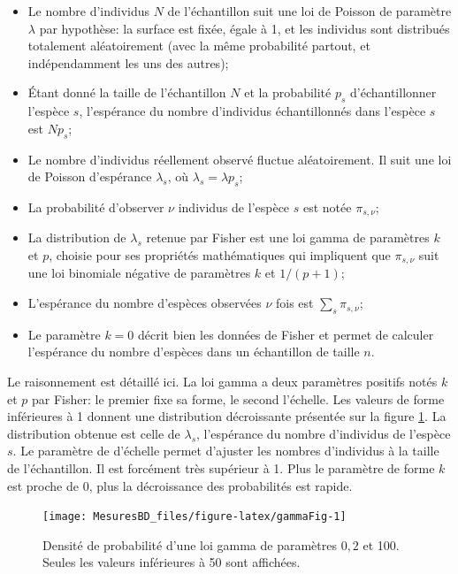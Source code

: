 \documentclass[
  11pt,
  french,
  a4paper,
  extrafontsizes,onecolumn,openright
  ]{memoir}
\providecommand{\tightlist}{%
  \setlength{\itemsep}{0pt}\setlength{\parskip}{0pt}}
\newlength{\rf}
\begin{document}
\begin{itemize}
\tightlist
\item
  Le nombre d'individus \(N\) de l'échantillon suit une loi de Poisson de paramètre \(\lambda\) par hypothèse: la surface est fixée, égale à 1, et les individus sont distribués totalement aléatoirement (avec la même probabilité partout, et indépendamment les uns des autres);
\item
  Étant donné la taille de l'échantillon \(N\) et la probabilité \(p_s\) d'échantillonner l'espèce \(s\), l'espérance du nombre d'individus échantillonnés dans l'espèce \(s\) est \(Np_s\);
\item
  Le nombre d'individus réellement observé fluctue aléatoirement.
  Il suit une loi de Poisson d'espérance \(\lambda_s\), où \(\lambda_s=\lambda p_s\);
\item
  La probabilité d'observer \(\nu\) individus de l'espèce \(s\) est notée \({\pi}_{s,\nu}\);
\item
  La distribution de \(\lambda_s\) retenue par Fisher est une loi gamma de paramètres \(k\) et \(p\), choisie pour ses propriétés mathématiques qui impliquent que \({\pi}_{s,\nu}\) suit une loi binomiale négative de paramètres \(k\) et \(1/(p+1)\);
\item
  L'espérance du nombre d'espèces observées \(\nu\) fois est \(\sum_s{{\pi}_{s,\nu}}\);
\item
  Le paramètre \(k=0\) décrit bien les données de Fisher et permet de calculer l'espérance du nombre d'espèces dans un échantillon de taille \(n\).
\end{itemize}

Le raisonnement est détaillé ici.
La loi gamma a deux paramètres positifs notés \(k\) et \(p\) par Fisher: le premier fixe sa forme, le second l'échelle.
Les valeurs de forme inférieures à 1 donnent une distribution décroissante présentée sur la figure \ref{fig:gammaFig}.
La distribution obtenue est celle de \(\lambda_s\), l'espérance du nombre d'individus de l'espèce \(s\).
Le paramètre de d'échelle permet d'ajuster les nombres d'individus à la taille de l'échantillon.
Il est forcément très supérieur à 1.
Plus le paramètre de forme \(k\) est proche de 0, plus la décroissance des probabilités est rapide.



\scriptsize

\begin{figure}

{\centering \texttt{[image: MesuresBD\_files/figure-latex/gammaFig-1]} 

}

\caption{Densité de probabilité d'une loi gamma de paramètres \(0,2\) et 100. Seules les valeurs inférieures à 50 sont affichées.}\label{fig:gammaFig}
\end{figure}
\end{document}
